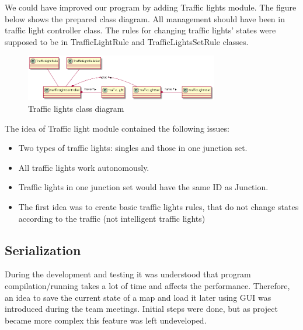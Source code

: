 We could have improved our program by adding Traffic lights module. The figure below shows the prepared class diagram. All management should have been in traffic light controller class. The rules for changing traffic lights' states were supposed to be in TrafficLightRule and TrafficLightsSetRule classes.

\begin{figure}[!h]
	\vspace{1.5em}
  	\caption{Traffic lights class diagram}
  	\label{fig:tf_diagram}
  	\centering
	\includegraphics[width=0.75\textwidth]{figs/junction/tf_diagram.png}
  	\vspace{1.5em}
\end{figure}

The idea of Traffic light module contained the following issues:
\begin{itemize}
    \item Two types of traffic lights: singles and those in one junction set.
    \item All traffic lights work autonomously.
    \item Traffic lights in one junction set would have the same ID as Junction.
    \item The first idea was to create basic traffic lights rules, that do not change states according to the traffic (not intelligent traffic lights)
\end{itemize}

\subsection{Serialization}
During the development and testing it was understood that program compilation/running takes a lot of time and affects the performance. Therefore, an idea to save the current state of a map and load it later using GUI was introduced during the team meetings. Initial steps were done, but as project became more complex this feature was left undeveloped.

